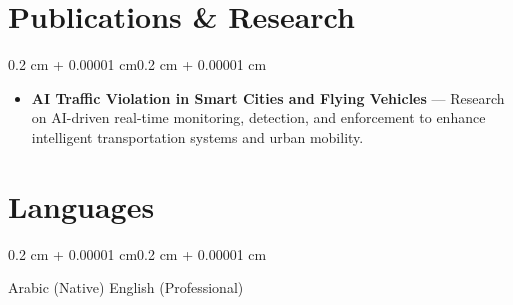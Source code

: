 \documentclass[10pt, letterpaper]{article}
\newenvironment{highlightsforbulletentries}{
  \begin{itemize}[
    topsep=0.10 cm,
    parsep=0.10 cm,
    partopsep=0pt,
    itemsep=0pt,
    leftmargin=10pt
  ]}
  {\end{itemize}
}
\newenvironment{onecolentry}{
  \begin{adjustwidth}{0.2 cm + 0.00001 cm}{0.2 cm + 0.00001 cm}
}{
  \end{adjustwidth}
}
\begin{document}
\section{Publications \& Research}
\begin{onecolentry}
\begin{highlightsforbulletentries}
  \item \textbf{AI Traffic Violation in Smart Cities and Flying Vehicles} — Research on AI-driven real-time monitoring, detection, and enforcement to enhance intelligent transportation systems and urban mobility.
\end{highlightsforbulletentries}
\end{onecolentry}

\section{Languages}
\begin{onecolentry}
  Arabic (Native) \quad\AND\quad English (Professional)
\end{onecolentry}
\end{document}
